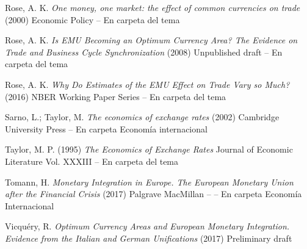 \documentclass{nuevotema}
\begin{document}
Rose, A. K. \textit{One money, one market: the effect of common currencies on trade} (2000) Economic Policy -- En carpeta del tema

Rose, A. K. \textit{Is EMU Becoming an Optimum Currency Area? The Evidence on Trade and Business Cycle Synchronization} (2008) Unpublished draft -- En carpeta del tema

Rose, A. K. \textit{Why Do Estimates of the EMU Effect on Trade Vary so Much?} (2016) NBER Working Paper Series -- En carpeta del tema

Sarno, L.; Taylor, M. \textit{The economics of exchange rates} (2002) Cambridge University Press -- En carpeta Economía internacional

Taylor, M. P. (1995) \textit{The Economics of Exchange Rates} Journal of Economic Literature Vol. XXXIII -- En carpeta del tema

Tomann, H. \textit{Monetary Integration in Europe. The European Monetary Union after the Financial Crisis} (2017) Palgrave MacMillan -- -- En carpeta Economía Internacional

Vicquéry, R. \textit{Optimum Currency Areas and European Monetary Integration. Evidence from the Italian and German Unifications} (2017) Preliminary draft 
\end{document}
